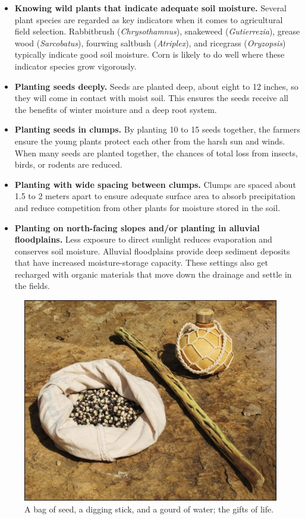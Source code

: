 \documentclass[12pt,]{article}
\providecommand{\tightlist}{%
  \setlength{\itemsep}{0pt}\setlength{\parskip}{0pt}}
\begin{document}
\begin{itemize}
\tightlist
\item
  \textbf{Knowing wild plants that indicate adequate soil moisture.} Several plant species are regarded as key indicators when it comes to agricultural field selection. Rabbitbrush (\emph{Chrysothamnus}), snakeweed (\emph{Gutierrezia}), grease wood (\emph{Sarcobatus}), fourwing saltbush (\emph{Atriplex}), and ricegrass (\emph{Oryzopsis}) typically indicate good soil moisture. Corn is likely to do well where these indicator species grow vigorously.
\item
  \textbf{Planting seeds deeply.} Seeds are planted deep, about eight to 12 inches, so they will come in contact with moist soil. This ensures the seeds receive all the benefits of winter moisture and a deep root system.
\item
  \textbf{Planting seeds in clumps.} By planting 10 to 15 seeds together, the farmers ensure the young plants protect each other from the harsh sun and winds. When many seeds are planted together, the chances of total loss from insects, birds, or rodents are reduced.
\item
  \textbf{Planting with wide spacing between clumps.} Clumps are spaced about 1.5 to 2 meters apart to ensure adequate surface area to absorb precipitation and reduce competition from other plants for moisture stored in the soil.
\item
  \textbf{Planting on north-facing slopes and/or planting in alluvial floodplains.} Less exposure to direct sunlight reduces evaporation and conserves soil moisture. Alluvial floodplains provide deep sediment deposits that have increased moisture-storage capacity. These settings also get recharged with organic materials that move down the drainage and settle in the fields.
\end{itemize}

\begin{figure}
\centering
\includegraphics{./images/gifts_of_life.jpg}
\caption{A bag of seed, a digging stick, and a gourd of water; the gifts of life.}
\end{figure}
\end{document}
